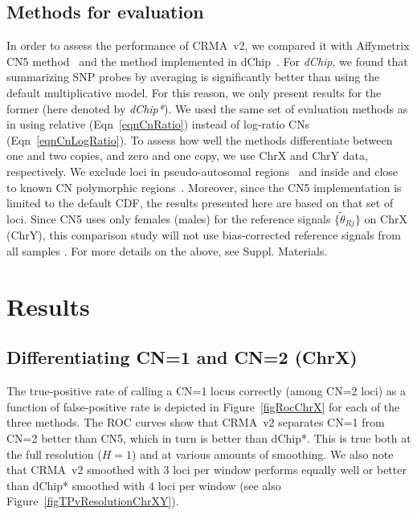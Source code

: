 \documentclass{bioinfo}
\newcommand{\TPrate}{true-positive rate\xspace}
\newcommand{\FPrate}{false-positive rate\xspace}
\begin{document}
\subsection{Methods for evaluation}
\label{secEvaluation}
In order to assess the performance of CRMA~v2, we compared it with Affymetrix CN5 method~\citep{Affymetrix_2008m} and the method implemented in dChip~\citep{LiWong_2001}.  For \emph{dChip}, we found that summarizing SNP probes by averaging is significantly better than using the default multiplicative model.  For this reason, we only present results for the former (here denoted by \emph{dChip*}).  
We used the same set of evaluation methods as in \citet{BengtssonH_etal_2008} using relative (Eqn~\eqref{eqnCnRatio}) instead of log-ratio CNs (Eqn~\eqref{eqnCnLogRatio}).
To assess how well the methods differentiate between one and two copies, and zero and one copy, we use ChrX and ChrY data, respectively.  We exclude loci in pseudo-autosomal regions~\citep{BlaschkeRappold_2006} and inside and close to known CN polymorphic regions~\citep{RedonR_etal_2006}.  Moreover, since the CN5 implementation is limited to the default CDF, the results presented here are based on that set of loci.  
Since CN5 uses only females (males) for the reference signals $\{\tilde\theta_{Rj}\}$ on ChrX (ChrY), this comparison study will not use bias-corrected reference signals from all samples \citep{BengtssonH_etal_2008}.
For more details on the above, see Suppl. Materials.


 
\section{Results}
\label{secResults}

\subsection{Differentiating CN=1 and CN=2 (ChrX)}
The \TPrate of calling a CN=1 locus correctly (among CN=2 loci) as a function of \FPrate is depicted in Figure~\ref{figRocChrX} for each of the three methods.
The ROC curves show that CRMA~v2 separates CN=1 from CN=2 better than CN5, which in turn is better than dChip*.  This is true both at the full resolution ($H=1$) and at various amounts of smoothing.  
We also note that CRMA~v2 smoothed with $3$ loci per window performs equally well or better than dChip* smoothed with $4$ loci per window (see also Figure~\ref{figTPvResolutionChrXY}).
\end{document}
